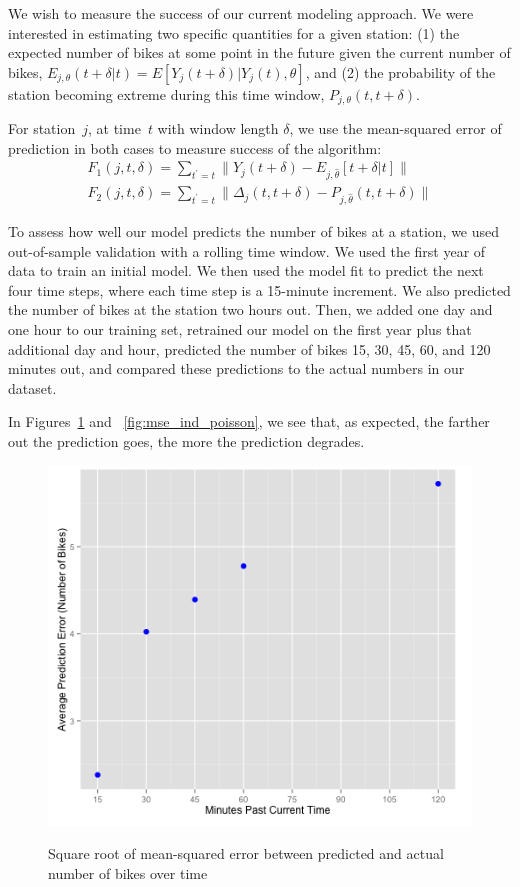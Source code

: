 \documentclass{acm_proc_article-sp}
\begin{document}
We wish to measure the success of our current modeling approach.  We were interested in estimating two specific quantities for a given station: (1) the expected number of bikes at some point in the future given the current number of bikes, $E_{j, \theta} (t+\delta | t) = E[ Y_j(t+\delta) | Y_j(t), \theta]$, and (2) the probability of the station becoming extreme during this time window, $P_{j,\theta} (t, t+\delta)$.

For station~$j$, at time~$t$ with window length $\delta$, we use the mean-squared error of prediction in both cases to measure success of the algorithm:
\begin{align}
F_1(j, t, \delta) = \sum_{t^\prime = t} \| Y_j(t + \delta) - E_{j,\hat{\theta}} [ t+\delta | t] \| \\
F_2(j, t, \delta) = \sum_{t^\prime = t} \| \Delta_j(t,t + \delta) - P_{j,\hat{\theta}} ( t, t+\delta) \|
\end{align}

\vspace{0.25cm}

To assess how well our model predicts the number of bikes at a station, we used out-of-sample validation with a rolling time window. We used the first year of data to train an initial model. We then used the model fit to predict the next four time steps, where each time step is a 15-minute increment. We also predicted the number of bikes at the station two hours out. 
Then, we added one day and one hour to our training set, retrained our model on the first year plus that additional day and hour, predicted the number of bikes 15, 30, 45, 60, and 120 minutes out, and compared these predictions to the actual numbers in our dataset. 

In Figures~\ref{fig:mse_poisson_bikes} and ~\ref{fig:mse_ind_poisson}, we see that, as expected, the farther out the prediction goes, the more the prediction degrades.
\begin{figure} [!h]
\caption{Square root of mean-squared error between predicted and actual number of bikes over time}
\centering
\includegraphics[scale = 0.4]{mse_poisson_bikes.png}
\label{fig:mse_poisson_bikes}
\end{figure}
\end{document}
